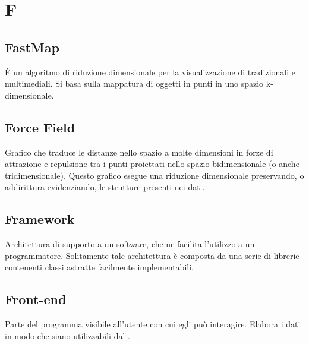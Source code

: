 \section*{F}
\markright{}

\subsection*{FastMap}
È un algoritmo di riduzione dimensionale per la visualizzazione di  tradizionali e multimediali. Si basa sulla mappatura di oggetti in punti in uno spazio k-dimensionale.

\subsection*{Force Field}
Grafico che traduce le distanze nello spazio a molte dimensioni in forze di attrazione e repulsione tra i punti proiettati nello spazio bidimensionale (o anche tridimensionale). Questo grafico esegue una riduzione dimensionale preservando, o addirittura evidenziando, le strutture presenti nei dati.

\subsection*{Framework}
Architettura di supporto a un software, che ne facilita l'utilizzo a un programmatore. Solitamente tale architettura è composta da una serie di librerie contenenti classi astratte facilmente implementabili. 

\subsection*{Front-end}
Parte del programma visibile all'utente con cui egli può interagire. Elabora i dati in modo che siano utilizzabili dal .